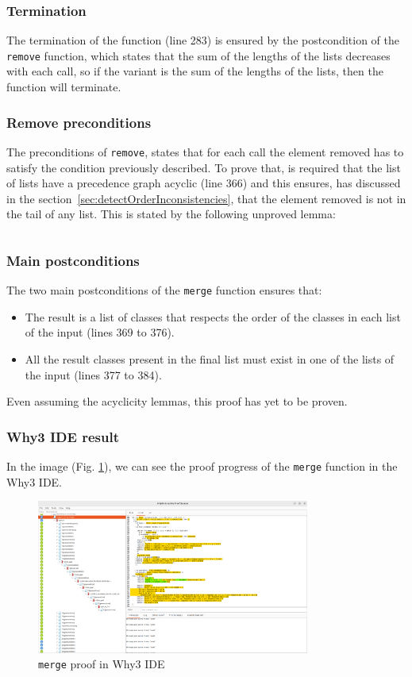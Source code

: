 \documentclass[runningheads]{llncs}
\begin{document}
\subsubsection{Termination}
The termination of the function (line 283) is ensured by the postcondition of the \texttt{remove} function, which states that the sum of the lengths of the lists decreases with each call, so if the variant is the sum of the lengths of the lists, then the function will terminate.
\subsubsection{Remove preconditions}
The preconditions of \texttt{remove}, states that for each call the element removed has to satisfy the condition previously described.
To prove that, is required that the list of lists have a precedence graph acyclic (line 366) and this ensures, has discussed in the section~\ref{sec:detectOrderInconsistencies}, 
that the element removed is not in the tail of any list. This is stated by the following unproved lemma:
\inputminted[firstline=198,lastline=203,fontsize=\small,linenos,xleftmargin=20pt]{ocaml}{../cameleer/c3.ml}
\subsubsection{Main postconditions}
The two main postconditions of the \texttt{merge} function ensures that:
\begin{itemize}
  \item The result is a list of classes that respects the order of the classes in each list of the input (lines 369 to 376).
  \item All the result classes present in the final list must exist in one of the lists of the input (lines 377 to 384).
\end{itemize}
Even assuming the acyclicity lemmas, this proof has yet to be proven.
\subsubsection{Why3 IDE result}
In the image (Fig. \ref{fig:Why3Merge}), we can see the proof progress of the \texttt{merge} function in the Why3 IDE.
\begin{figure}[htbp]
  \centering
  \includegraphics[width=0.8\textwidth]{images/Why3merge.png}
  \caption{\texttt{merge} proof in Why3 IDE}
  \label{fig:Why3Merge}
\end{figure}
\end{document}
